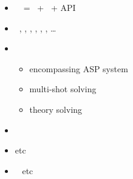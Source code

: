 \begin{frame}{\clingo}
  \begin{itemize}
  \item {} \ \clingo\ = \gringo\ + \clasp\ + API
  \item {} \
    \cpp,
    \java,
    \lua,
    \prolog,
    \python,
    \rust,
    \dots
  \item {} \
    \begin{itemize}
    \item encompassing ASP system
    \item multi-shot solving
    \item theory solving
    \end{itemize}
  \item {} \ \cite{gekakasc17a,jakaosscscwa17a,karoscwa21a}
  \item {} \par
    \cite{liutru13a,gamarowawo15a,erdher20a,erfimapr20a,bojawe19a,schwitter12a,dabmar20a,ngstsoye20a,smanmapo12a,cosmma12a,dikophps20a,wotawa20a,bogerd20a,aisaam18a,becadolemamava21a,izmerd20a} etc
  \item \structure{Systems} \
    \cite{cafamu20a,bablee13a,scbhsuwa18a,tepfri18a,dvrawawo20a,bainkaokscsotawa18a,reraigpajh19a,eikarescwe17a} etc
  \end{itemize}
\end{frame}
%
